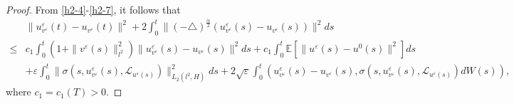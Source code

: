 \documentclass[11pt]{article}
\numberwithin{equation}{section}
\theoremstyle{plain}
\def\leq{\leqslant}
\begin{document}
\begin{proof}
    From \eqref{h2-4}-\eqref{h2-7}, it follows that
    \begin{align}\label{h2-8}
        & \| u_{v^\varepsilon}^\varepsilon(t) - u_{v^\varepsilon}(t) \|^2
        + 2 \int_0^t
        \| (-\triangle)^{\frac{\alpha}{2}}
        \left( u_{v^\varepsilon}^\varepsilon (s)
        - u_{v^\varepsilon}(s)
        \right)
        \|^2 ds  \nonumber \\
        \leq &  c_1
        \int_0^t \left( 1    + \| v^\varepsilon(s) \|^2_{l^2} \right)
        \| u_{v^\varepsilon}^\varepsilon(s)
        - u_{v^\varepsilon}(s) \|^2 ds
        + c_1
        \int_0^t \mathbb{E} \left[ \| u^\varepsilon(s) - u^0(s) \|^2 \right] ds
        \nonumber \\
        &
        + \varepsilon \int_{0}^{t}
        \| \sigma(s, u_{v^\varepsilon}^\varepsilon(s), \mathcal{L}_{u^\varepsilon(s)}) \|^2_{L_2(l^2, H)}ds
        + 2 \sqrt{\varepsilon} \int_{0}^{t}
        \left( u_{v^\varepsilon}^\varepsilon(s) - u_{v^\varepsilon}(s),
        \sigma(s, u_{v^\varepsilon}^\varepsilon(s), \mathcal{L}_{u^\varepsilon(s)} ) dW(s)
        \right),
    \end{align}
    where
    $c_1=c_1(T)>0$.


\end{proof}
\end{document}
